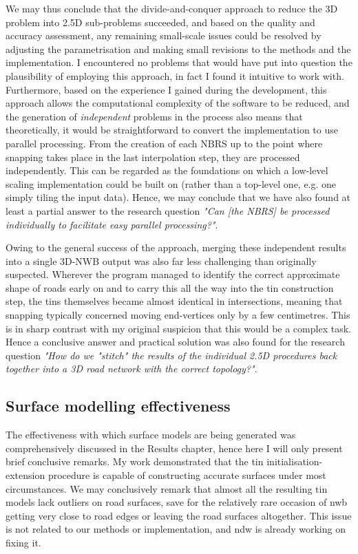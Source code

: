 We may thus conclude that the divide-and-conquer approach to reduce the 3D problem into 2.5D sub-problems succeeded, and based on the quality and accuracy assessment, any remaining small-scale issues could be resolved by adjusting the parametrisation and making small revisions to the methods and the implementation. I encountered no problems that would have put into question the plausibility of employing this approach, in fact I found it intuitive to work with. Furthermore, based on the experience I gained during the development, this approach allows the computational complexity of the software to be reduced, and the generation of \textit{independent} problems in the process also means that theoretically, it would be straightforward to convert the implementation to use parallel processing. From the creation of each NBRS up to the point where snapping takes place in the last interpolation step, they are processed independently. This can be regarded as the foundations on which a low-level scaling implementation could be built on (rather than a top-level one, e.g. one simply tiling the input data). Hence, we may conclude that we have also found at least a partial answer to the research question \textit{"Can [the NBRS] be processed individually to facilitate easy parallel processing?"}.

Owing to the general success of the approach, merging these independent results into a single 3D-NWB output was also far less challenging than originally suspected. Wherever the program managed to identify the correct approximate shape of roads early on and to carry this all the way into the \ac{tin} construction step, the \ac{tin}s themselves became almost identical in intersections, meaning that snapping typically concerned moving end-vertices only by a few centimetres. This is in sharp contrast with my original suspicion that this would be a complex task. Hence a conclusive answer and practical solution was also found for the research question \textit{"How do we "stitch" the results of the individual 2.5D procedures back together into a 3D road network with the correct topology?"}.

\subsection{Surface modelling effectiveness}
\label{sub:effectivenessmodelling}

The effectiveness with which surface models are being generated was comprehensively discussed in the Results chapter, hence here I will only present brief conclusive remarks. My work demonstrated that the \ac{tin} initialisation-extension procedure is capable of constructing accurate surfaces under most circumstances. We may conclusively remark that almost all the resulting \ac{tin} models lack outliers on road surfaces, save for the relatively rare occasion of \ac{nwb} getting very close to road edges or leaving the road surfaces altogether. This issue is not related to our methods or implementation, and \ac{ndw} is already working on fixing it.

